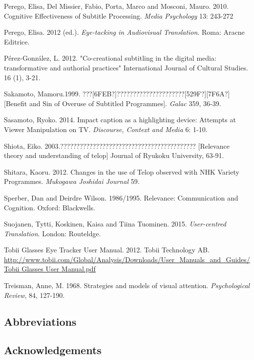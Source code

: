 \documentclass[output=paper]{langsci/langscibook}
\begin{document}
Perego, Elisa, Del Missier, Fabio, Porta, Marco and Mosconi, Mauro. 2010. Cognitive Effectiveness of Subtitle Processing. \textit{Media Psychology} 13: 243-272



Perego, Elisa. 2012 (ed.). \textit{Eye-tacking in Audiovisual Translation}. Roma: Aracne Editrice.



P\'{e}rez-Gonz\'{a}lez, L. 2012. "Co-creational subtitling in the digital media: transformative and authorial practices" International Journal of Cultural Studies. 16 (1), 3-21.



Sakamoto, Mamoru.1999. ???[6FEB?]?????????????????????[529F?][7F6A?] [Benefit and Sin of Overuse of Subtitled Programmes]. \textit{Galac} 359, 36-39.



Sasamoto, Ryoko. 2014. Impact caption as a highlighting device: Attempts at Viewer Manipulation on TV. \textit{Discourse, Context and Media} 6: 1-10.



Shiota, Eiko. 2003.?????????????????????????????????????????? [Relevance theory and understanding of telop] Journal of Ryukoku University, 63-91.



Shitara, Kaoru. 2012. Changes in the use of Telop observed with NHK Variety Programmes. \textit{Mukogawa Joshidai Journal} 59.



Sperber, Dan and Deirdre Wilson. 1986/1995. Relevance: Communication and Cognition. Oxford: Blackwells.



Suojanen, Tytti, Koskinen, Kaisa and Tiina Tuominen. 2015. \textit{User-centred Translation}. London: Routeldge.



Tobii Glasses Eye Tracker User Manual. 2012. Tobii Technology AB.  \url{http://www.tobii.com/Global/Analysis/Downloads/User_Manuals_and_Guides/Tobii Glasses User Manual.pdf}



Treisman, Anne, M. 1968. Strategies and models of visual attention. \textit{Psychological Review}, 84, 127-190.


\subsection*{Abbreviations}
\subsection*{Acknowledgements}

\printbibliography[heading=subbibliography,notkeyword=this]
\end{document}
